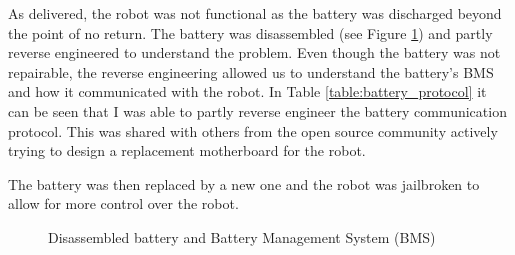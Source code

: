 \documentclass[11pt]{article}
\begin{document}
        As delivered, the robot was not functional as the battery was discharged beyond the point of no return. The battery was disassembled (see Figure \ref{fig:disassembled_battery}) and partly reverse engineered to understand the problem. Even though the battery was not repairable, the reverse engineering allowed us to understand the battery's BMS and how it communicated with the robot. In Table \ref{table:battery_protocol} it can be seen that I was able to partly reverse engineer the battery communication protocol. This was shared with others from the open source community actively trying to design a replacement motherboard for the robot. 
        
        The battery was then replaced by a new one and the robot was jailbroken to allow for more control over the robot.
        

        \begin{figure}[h]
            \centering
            \caption{Disassembled battery and Battery Management System (BMS)}
            \label{fig:disassembled_battery}
        \end{figure}
\end{document}
